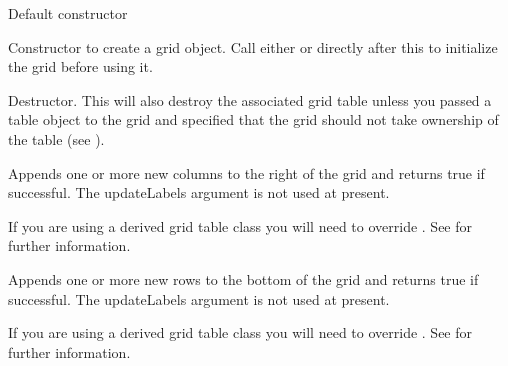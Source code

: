 
Default constructor


Constructor to create a grid object. Call either  or 
 directly after this to initialize the grid before using
it. 

\label{wxgriddtor}


Destructor. This will also destroy the associated grid table unless you passed a table
object to the grid and specified that the grid should not take ownership of the
table (see ). 

\label{wxgridappendcols}


Appends one or more new columns to the right of the grid and returns true if
successful. The updateLabels argument is not used at present.

If you are using a derived grid table class you will need to override 
. See 
 for further information. 

\label{wxgridappendrows}


Appends one or more new rows to the bottom of the grid and returns true if
successful. The updateLabels argument is not used at present.

If you are using a derived grid table class you will need to override 
. See 
 for further information. 

\label{wxgridautosize}



